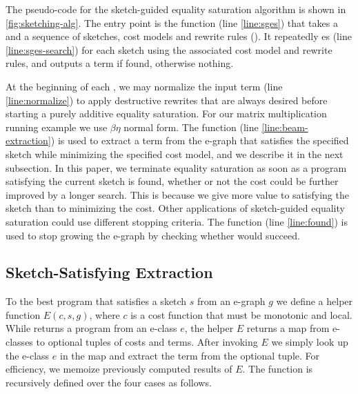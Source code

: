 The pseudo-code for the sketch-guided equality saturation algorithm is shown in \cref{fig:sketching-alg}.
The entry point is the  function (line \ref{line:sges}) that takes  a  and a sequence of sketches, cost models and rewrite rules (). It repeatedly es (line \ref{line:sges-search}) for each sketch using the associated cost model and rewrite rules, and outputs a term if found, otherwise nothing.

At the beginning of each , we may normalize the input term (line \ref{line:normalize}) to apply destructive rewrites that are always desired before starting a purely additive equality saturation.
For our matrix multiplication running example we use $\beta\eta$ normal form.
The  function (line \ref{line:beam-extraction}) is used to extract a term from the e-graph that satisfies the specified sketch while minimizing the specified cost model, and we describe it in the next subsection.
In this paper, we terminate equality saturation as soon as a program satisfying the current sketch is found, whether or not the cost could be further improved by a longer search.
This is because we give more value to satisfying the sketch than to minimizing the cost.
Other applications of sketch-guided equality saturation could use different stopping criteria.
The  function (line \ref{line:found}) is used to stop growing the e-graph by checking whether  would succeed.

\subsection{Sketch-Satisfying Extraction}
\label{beam-extraction}

To  the best program that satisfies a \sLang{} sketch $s$ from an e-graph $g$ we define a helper function $E(c, s, g)$, where $c$ is a cost function that must be monotonic and local.
While  returns a program from an e-class $e$, the helper $E$ returns a map from e-classes to optional tuples of costs and terms.
After invoking $E$ we simply look up the e-class $e$ in the map and extract the term from the optional tuple.
For efficiency, we memoize previously computed results of $E$.
The  function is recursively defined over the four \sLang{} cases as follows.

